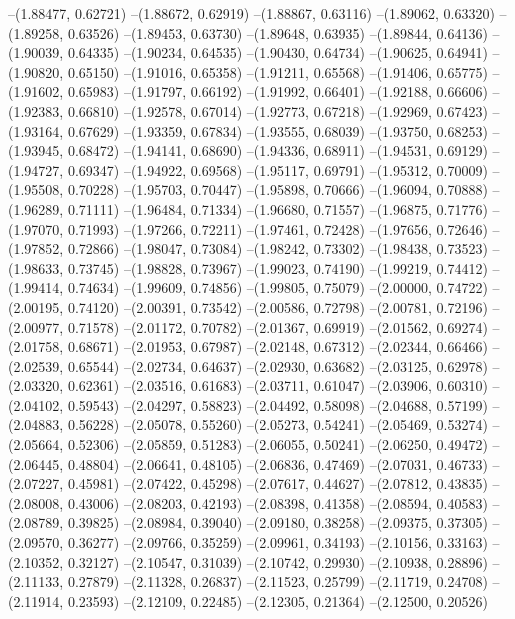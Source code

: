 --(1.88477, 0.62721)
--(1.88672, 0.62919)
--(1.88867, 0.63116)
--(1.89062, 0.63320)
--(1.89258, 0.63526)
--(1.89453, 0.63730)
--(1.89648, 0.63935)
--(1.89844, 0.64136)
--(1.90039, 0.64335)
--(1.90234, 0.64535)
--(1.90430, 0.64734)
--(1.90625, 0.64941)
--(1.90820, 0.65150)
--(1.91016, 0.65358)
--(1.91211, 0.65568)
--(1.91406, 0.65775)
--(1.91602, 0.65983)
--(1.91797, 0.66192)
--(1.91992, 0.66401)
--(1.92188, 0.66606)
--(1.92383, 0.66810)
--(1.92578, 0.67014)
--(1.92773, 0.67218)
--(1.92969, 0.67423)
--(1.93164, 0.67629)
--(1.93359, 0.67834)
--(1.93555, 0.68039)
--(1.93750, 0.68253)
--(1.93945, 0.68472)
--(1.94141, 0.68690)
--(1.94336, 0.68911)
--(1.94531, 0.69129)
--(1.94727, 0.69347)
--(1.94922, 0.69568)
--(1.95117, 0.69791)
--(1.95312, 0.70009)
--(1.95508, 0.70228)
--(1.95703, 0.70447)
--(1.95898, 0.70666)
--(1.96094, 0.70888)
--(1.96289, 0.71111)
--(1.96484, 0.71334)
--(1.96680, 0.71557)
--(1.96875, 0.71776)
--(1.97070, 0.71993)
--(1.97266, 0.72211)
--(1.97461, 0.72428)
--(1.97656, 0.72646)
--(1.97852, 0.72866)
--(1.98047, 0.73084)
--(1.98242, 0.73302)
--(1.98438, 0.73523)
--(1.98633, 0.73745)
--(1.98828, 0.73967)
--(1.99023, 0.74190)
--(1.99219, 0.74412)
--(1.99414, 0.74634)
--(1.99609, 0.74856)
--(1.99805, 0.75079)
--(2.00000, 0.74722)
--(2.00195, 0.74120)
--(2.00391, 0.73542)
--(2.00586, 0.72798)
--(2.00781, 0.72196)
--(2.00977, 0.71578)
--(2.01172, 0.70782)
--(2.01367, 0.69919)
--(2.01562, 0.69274)
--(2.01758, 0.68671)
--(2.01953, 0.67987)
--(2.02148, 0.67312)
--(2.02344, 0.66466)
--(2.02539, 0.65544)
--(2.02734, 0.64637)
--(2.02930, 0.63682)
--(2.03125, 0.62978)
--(2.03320, 0.62361)
--(2.03516, 0.61683)
--(2.03711, 0.61047)
--(2.03906, 0.60310)
--(2.04102, 0.59543)
--(2.04297, 0.58823)
--(2.04492, 0.58098)
--(2.04688, 0.57199)
--(2.04883, 0.56228)
--(2.05078, 0.55260)
--(2.05273, 0.54241)
--(2.05469, 0.53274)
--(2.05664, 0.52306)
--(2.05859, 0.51283)
--(2.06055, 0.50241)
--(2.06250, 0.49472)
--(2.06445, 0.48804)
--(2.06641, 0.48105)
--(2.06836, 0.47469)
--(2.07031, 0.46733)
--(2.07227, 0.45981)
--(2.07422, 0.45298)
--(2.07617, 0.44627)
--(2.07812, 0.43835)
--(2.08008, 0.43006)
--(2.08203, 0.42193)
--(2.08398, 0.41358)
--(2.08594, 0.40583)
--(2.08789, 0.39825)
--(2.08984, 0.39040)
--(2.09180, 0.38258)
--(2.09375, 0.37305)
--(2.09570, 0.36277)
--(2.09766, 0.35259)
--(2.09961, 0.34193)
--(2.10156, 0.33163)
--(2.10352, 0.32127)
--(2.10547, 0.31039)
--(2.10742, 0.29930)
--(2.10938, 0.28896)
--(2.11133, 0.27879)
--(2.11328, 0.26837)
--(2.11523, 0.25799)
--(2.11719, 0.24708)
--(2.11914, 0.23593)
--(2.12109, 0.22485)
--(2.12305, 0.21364)
--(2.12500, 0.20526)
